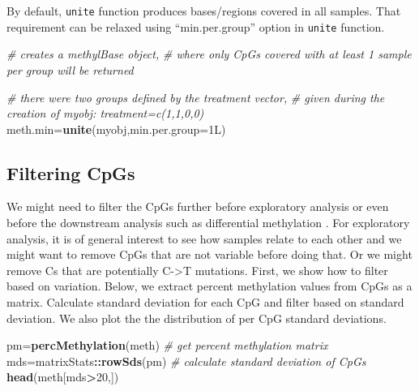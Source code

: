 \documentclass[12pt,]{krantz}
\newenvironment{Shaded}{\begin{snugshade}}{\end{snugshade}}
\newcommand{\CommentTok}[1]{\textcolor[rgb]{0.56,0.35,0.01}{\textit{#1}}}
\newcommand{\DataTypeTok}[1]{\textcolor[rgb]{0.13,0.29,0.53}{#1}}
\newcommand{\DecValTok}[1]{\textcolor[rgb]{0.00,0.00,0.81}{#1}}
\newcommand{\KeywordTok}[1]{\textcolor[rgb]{0.13,0.29,0.53}{\textbf{#1}}}
\newcommand{\NormalTok}[1]{#1}
\newcommand{\OperatorTok}[1]{\textcolor[rgb]{0.81,0.36,0.00}{\textbf{#1}}}
\begin{document}
By default, \texttt{unite} function produces bases/regions covered in all samples. That requirement can be relaxed using ``min.per.group'' option in \texttt{unite} function.

\begin{Shaded}
\begin{Highlighting}[]
\CommentTok{# creates a methylBase object, }
\CommentTok{# where only CpGs covered with at least 1 sample per group will be returned}

\CommentTok{# there were two groups defined by the treatment vector, }
\CommentTok{# given during the creation of myobj: treatment=c(1,1,0,0)}
\NormalTok{meth.min=}\KeywordTok{unite}\NormalTok{(myobj,}\DataTypeTok{min.per.group=}\NormalTok{1L)}
\end{Highlighting}
\end{Shaded}

\hypertarget{filtering-cpgs}{%
\subsection{Filtering CpGs}\label{filtering-cpgs}}

We might need to filter the CpGs further before exploratory analysis or even before the downstream analysis such as differential methylation . For exploratory analysis, it is of general interest to see how samples relate to each other and we might want to remove CpGs that are not variable before doing that. Or we might remove Cs that are potentially C-\textgreater{}T mutations. First, we show how to
filter based on variation. Below, we extract percent methylation values from CpGs as a matrix. Calculate standard deviation for each CpG and filter based on standard deviation. We also plot the the distribution of per CpG standard deviations.

\begin{Shaded}
\begin{Highlighting}[]
\NormalTok{pm=}\KeywordTok{percMethylation}\NormalTok{(meth) }\CommentTok{# get percent methylation matrix}
\NormalTok{mds=matrixStats}\OperatorTok{::}\KeywordTok{rowSds}\NormalTok{(pm) }\CommentTok{# calculate standard deviation of CpGs}
\KeywordTok{head}\NormalTok{(meth[mds}\OperatorTok{>}\DecValTok{20}\NormalTok{,])}
\end{Highlighting}
\end{Shaded}
\end{document}
